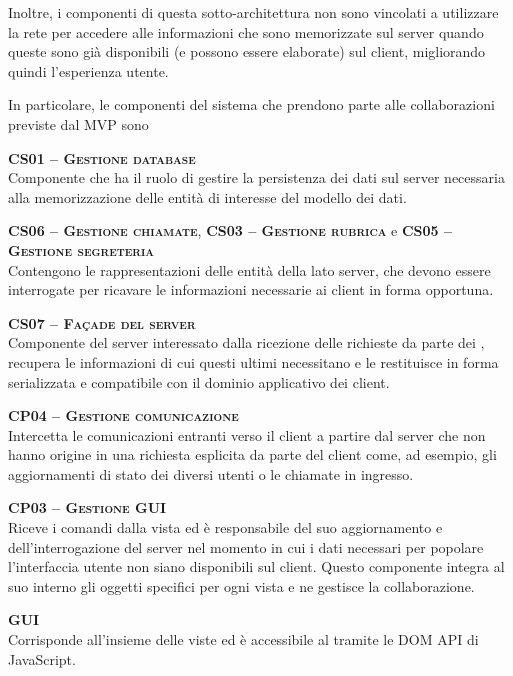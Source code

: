 Inoltre, i componenti di questa sotto-architettura non sono vincolati a utilizzare la rete per accedere alle informazioni che sono memorizzate sul server quando queste sono già disponibili (e possono essere elaborate) sul client, migliorando quindi l'esperienza utente.

In particolare, le componenti del sistema che prendono parte alle collaborazioni previste dal  MVP sono
\begin{description}
  \item{\scshape\bfseries CS01 -- Gestione database}\\
Componente che ha il ruolo di gestire la persistenza dei dati sul server necessaria alla memorizzazione delle entità di interesse del modello dei dati.

  \item{\textsc{\bfseries CS06 -- Gestione chiamate}, \textsc{\bfseries CS03 -- Gestione rubrica} e \textsc{\bfseries CS05 -- Gestione segreteria}}\\
Contengono le rappresentazioni delle entità della  lato server, che devono essere interrogate per ricavare le informazioni necessarie ai client in forma opportuna.

  \item{\scshape\bfseries CS07 -- Façade del server}\\
Componente del server interessato dalla ricezione delle richieste da parte dei , recupera le informazioni di cui questi ultimi necessitano e le restituisce in forma serializzata e compatibile con il dominio applicativo dei client.

  \item{\scshape\bfseries CP04 -- Gestione comunicazione}\\
Intercetta le comunicazioni entranti verso il client a partire dal server che non hanno origine in una richiesta esplicita da parte del client come, ad esempio, gli aggiornamenti di stato dei diversi utenti o le chiamate in ingresso.
  
  \item{\scshape\bfseries CP03 -- Gestione GUI}\\
Riceve i comandi dalla vista ed è responsabile del suo aggiornamento e dell'interrogazione del server nel momento in cui i dati necessari per popolare l'interfaccia utente non siano disponibili sul client. Questo componente integra al suo interno gli oggetti  specifici per ogni vista e ne gestisce la collaborazione.

  \item{\scshape\bfseries GUI}\\
Corrisponde all'insieme delle viste ed è accessibile al  tramite le DOM API di JavaScript.
\end{description}

